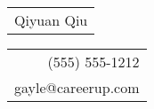 \documentclass{article}
\begin{document}
\sffamily%
{\Huge\begin{tabular}[c]{l}
  Qiyuan Qiu \\
\end{tabular}}\hfill%
{\small\begin{tabular}[c]{r}
  (555) 555-1212 \\
  gayle@careerup.com
\end{tabular}}%
\bigskip
\end{document}
